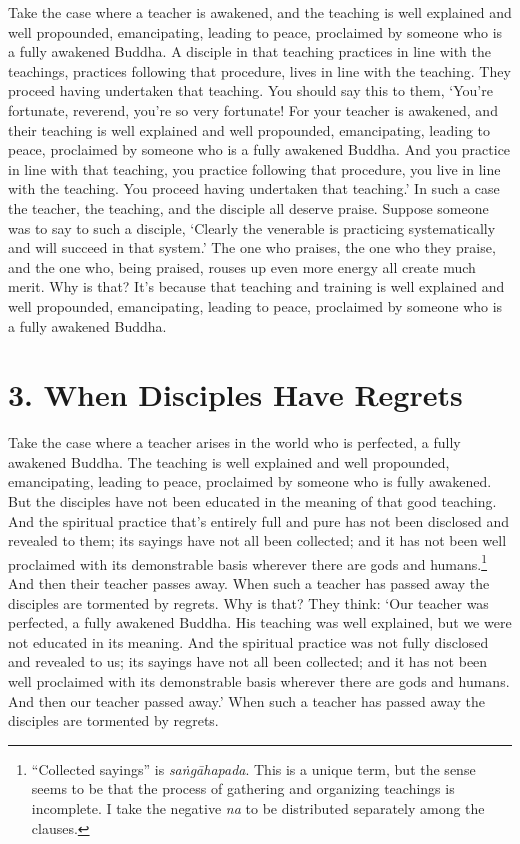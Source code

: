 \documentclass[12pt,openany]{book}%
\begin{document}
Take the case where a teacher is awakened, and the teaching is well explained and well propounded, emancipating, leading to peace, proclaimed by someone who is a fully awakened Buddha. A disciple in that teaching practices in line with the teachings, practices following that procedure, lives in line with the teaching. They proceed having undertaken that teaching. You should say this to them, ‘You’re fortunate, reverend, you’re so very fortunate! For your teacher is awakened, and their teaching is well explained and well propounded, emancipating, leading to peace, proclaimed by someone who is a fully awakened Buddha. And you practice in line with that teaching, you practice following that procedure, you live in line with the teaching. You proceed having undertaken that teaching.’ In such a case the teacher, the teaching, and the disciple all deserve praise. Suppose someone was to say to such a disciple, ‘Clearly the venerable is practicing systematically and will succeed in that system.’ The one who praises, the one who they praise, and the one who, being praised, rouses up even more energy all create much merit. Why is that? It’s because that teaching and training is well explained and well propounded, emancipating, leading to peace, proclaimed by someone who is a fully awakened Buddha. 

\section*{3. When Disciples Have Regrets }

Take the case where a teacher arises in the world who is perfected, a fully awakened Buddha. The teaching is well explained and well propounded, emancipating, leading to peace, proclaimed by someone who is fully awakened. But the disciples have not been educated in the meaning of that good teaching. And the spiritual practice that’s entirely full and pure has not been disclosed and revealed to them; its sayings have not all been collected; and it has not been well proclaimed with its demonstrable basis wherever there are gods and humans.\footnote{“Collected sayings” is \textit{\textsanskrit{saṅgāhapada}}. This is a unique term, but the sense seems to be that the process of gathering  and organizing teachings is incomplete. I take the negative \textit{na} to be distributed separately among the clauses. } And then their teacher passes away. When such a teacher has passed away the disciples are tormented by regrets. Why is that? They think: ‘Our teacher was perfected, a fully awakened Buddha. His teaching was well explained, but we were not educated in its meaning. And the spiritual practice was not fully disclosed and revealed to us; its sayings have not all been collected; and it has not been well proclaimed with its demonstrable basis wherever there are gods and humans. And then our teacher passed away.’ When such a teacher has passed away the disciples are tormented by regrets. 
\end{document}
